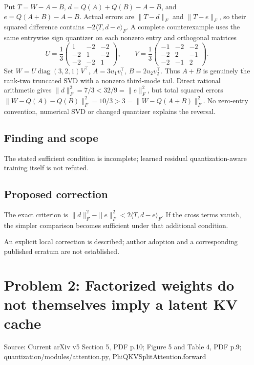 \documentclass[11pt]{article}
\begin{document}
Put \(T=W-A-B\), \(d=Q(A)+Q(B)-A-B\), and \(e=Q(A+B)-A-B\). Actual errors are \(\|T-d\|_F\) and \(\|T-e\|_F\), so their squared difference contains \(-2\langle T,d-e\rangle_F\). A complete counterexample uses the same entrywise sign quantizer on each nonzero entry and orthogonal matrices \[U=\frac13\begin{pmatrix}1&-2&-2\\-2&1&-2\\-2&-2&1\end{pmatrix},\qquad V=\frac13\begin{pmatrix}-1&-2&-2\\-2&2&-1\\-2&-1&2\end{pmatrix}.\] Set \(W=U\operatorname{diag}(3,2,1)V^\top\), \(A=3u_1v_1^\top\), \(B=2u_2v_2^\top\). Thus \(A+B\) is genuinely the rank-two truncated SVD with a nonzero third-mode tail. Direct rational arithmetic gives \(\|d\|_F^2=7/3<32/9=\|e\|_F^2\), but total squared errors \(\|W-Q(A)-Q(B)\|_F^2=10/3>3=\|W-Q(A+B)\|_F^2\). No zero-entry convention, numerical SVD or changed quantizer explains the reversal.

\subsection*{Finding and scope}

The stated sufficient condition is incomplete; learned residual quantization-aware training itself is not refuted.

\subsection*{Proposed correction}

The exact criterion is \(\|d\|_F^2-\|e\|_F^2<2\langle T,d-e\rangle_F\). If the cross terms vanish, the simpler comparison becomes sufficient under that additional condition.

An explicit local correction is described; author adoption and a corresponding published erratum are not established.

\section*{Problem 2: Factorized weights do not themselves imply a latent KV cache}

Source: Current arXiv v5 Section 5, PDF p.10; Figure 5 and Table 4, PDF p.9; quantization/modules/attention.py, PhiQKVSplitAttention.forward
\end{document}
